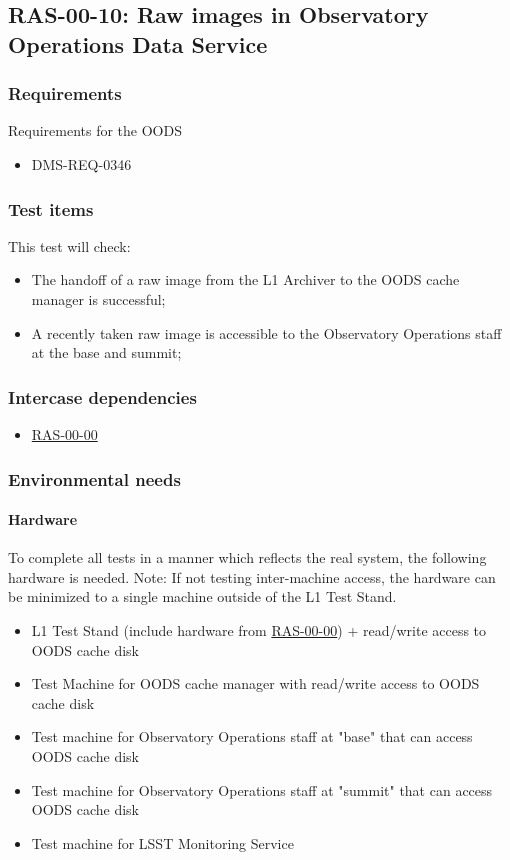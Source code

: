 \documentclass[DM,lsstdraft,STS,toc]{lsstdoc}
\begin{document}
\subsection{RAS-00-10: Raw images in Observatory Operations Data Service}
\label{ras-00-10}
\subsubsection{Requirements}
Requirements for the OODS
\begin{itemize}
\item{DMS-REQ-0346}
\end{itemize}


\subsubsection{Test items}
This test will check:
\begin{itemize}
\item{The handoff of a raw image from the L1 Archiver to the OODS cache manager is successful;}
\item{A recently taken raw image is accessible to the Observatory Operations staff at the base and summit;}
\end{itemize}


\subsubsection{Intercase dependencies}
\begin{itemize}
\item{\hyperref[ras-00-00]{RAS-00-00}}
\end{itemize}


\subsubsection{Environmental needs}
\paragraph{Hardware}


To complete all tests in a manner which reflects the real system,
the following hardware is needed.  Note: If not testing inter-machine access, the hardware can be minimized to a single machine outside of the L1 Test Stand.


\begin{itemize}
\item{L1 Test Stand (include hardware from \hyperref[ras-00-00]{RAS-00-00}) + read/write access to OODS cache disk}
\item{Test Machine for OODS cache manager with read/write access to OODS cache disk}
\item{Test machine for Observatory Operations staff at "base" that can access OODS cache disk}
\item{Test machine for Observatory Operations staff at "summit" that can access OODS cache disk}
\item{Test machine for LSST Monitoring Service}
\end{itemize}
\end{document}
